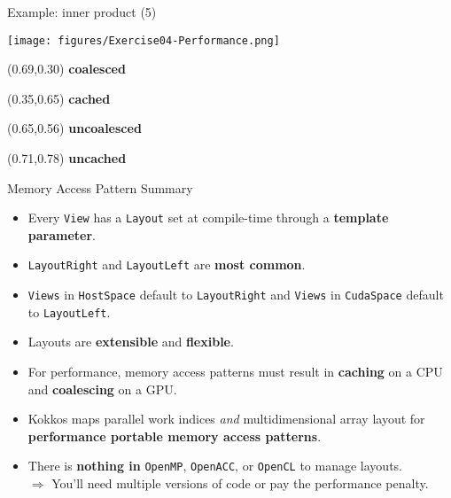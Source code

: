 \begin{frame}[fragile]{Example: inner product (5)}

  \vspace{-5pt}
  \hspace{-15pt}
    \texttt{[image: figures/Exercise04-Performance.png]}
  \vspace{-15pt}

  \begin{textblock*}{0.5\textwidth}(0.69\textwidth,0.30\textheight)
    \textbf{coalesced}
  \end{textblock*}

  \begin{textblock*}{0.5\textwidth}(0.35\textwidth,0.65\textheight)
    \textbf{cached}
  \end{textblock*}

  \begin{textblock*}{0.5\textwidth}(0.65\textwidth,0.56\textheight)
    \textbf{uncoalesced}
  \end{textblock*}

  \begin{textblock*}{0.5\textwidth}(0.71\textwidth,0.78\textheight)
    \textbf{uncached}
  \end{textblock*}

\end{frame}


\begin{frame}{Memory Access Pattern Summary}

  \begin{itemize}
    \item{Every \texttt{View} has a \texttt{Layout} set at compile-time through a \textbf{template parameter}.}
    \item{\texttt{LayoutRight} and \texttt{LayoutLeft} are \textbf{most common}.}
    \item{\texttt{Views} in \texttt{HostSpace} default to \texttt{LayoutRight} and \texttt{Views} in \texttt{CudaSpace} default to \texttt{LayoutLeft}.}
    \item{Layouts are \textbf{extensible} and \textbf{flexible}.}
    \item{For performance, memory access patterns must result in \textbf{caching} on a CPU and \textbf{coalescing} on a GPU.}
    \item{Kokkos maps parallel work indices \textit{and} multidimensional array layout for \textbf{performance portable memory access patterns}.}
    \item{There is \textbf{nothing in} \texttt{OpenMP}, \texttt{OpenACC}, or \texttt{OpenCL} to manage layouts.}\\
    $\Rightarrow$ You'll need multiple versions of code or pay the performance penalty.
  \end{itemize}

\end{frame}
